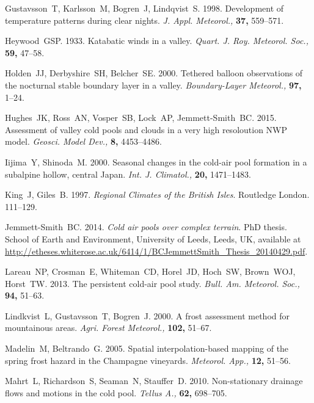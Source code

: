 \documentclass[times]{qjrms4}
\begin{document}
\begin{thebibliography}{99}
Gustavsson~T, Karlsson~M, Bogren~J, Lindqvist~S. 1998. Development of temperature patterns during clear nights. \emph{J. Appl. Meteorol.,} {\bf 37,} 559--571.

Heywood~GSP. 1933. Katabatic winds in a valley. \emph{Quart. J. Roy. Meteorol. Soc.,} {\bf 59,} 47--58.

Holden~JJ, Derbyshire~SH, Belcher~SE. 2000. Tethered balloon observations of the nocturnal stable boundary layer in a valley. \emph{Boundary-Layer Meteorol.,} {\bf 97,} 1--24.

Hughes~JK, Ross~AN, Vosper~SB, Lock~AP, Jemmett-Smith~BC. 2015. Assessment of valley cold pools and clouds in a very high resoloution NWP model. \emph{Geosci. Model Dev.,} {\bf 8,} 4453--4486.

Iijima~Y, Shinoda~M. 2000. Seasonal changes in the cold-air pool formation in a subalpine hollow, central Japan. \emph{Int. J. Climatol.,} {\bf 20,} 1471--1483.

King~J, Giles~B. 1997. \emph{Regional Climates of the British Isles}. Routledge London. 111--129.

Jemmett-Smith~BC. 2014. \emph{Cold air pools over complex terrain}. PhD thesis. School of Earth and Environment, University of Leeds, Leeds, UK, available at \url{http://etheses.whiterose.ac.uk/6414/1/BCJemmettSmith_Thesis_20140429.pdf}.

Lareau~NP, Crosman~E, Whiteman~CD, Horel~JD, Hoch~SW, Brown~WOJ, Horst~TW. 2013. The persistent cold-air pool study. \emph{Bull. Am. Meteorol. Soc.,} {\bf 94,} 51--63.

Lindkvist~L, Gustavsson~T, Bogren~J. 2000. A frost assessment method for mountainous areas. \emph{Agri. Forest Meteorol.,} {\bf 102,} 51--67.

Madelin~M, Beltrando~G. 2005. Spatial interpolation-based mapping of the spring frost hazard in the Champagne vineyards. \emph{Meteorol. App.,} {\bf 12,} 51--56.

Mahrt~L, Richardson~S, Seaman~N, Stauffer~D. 2010. Non-stationary drainage flows and motions in the cold pool. \emph{Tellus A.,} {\bf 62,} 698--705.


\end{thebibliography}
\end{document}
